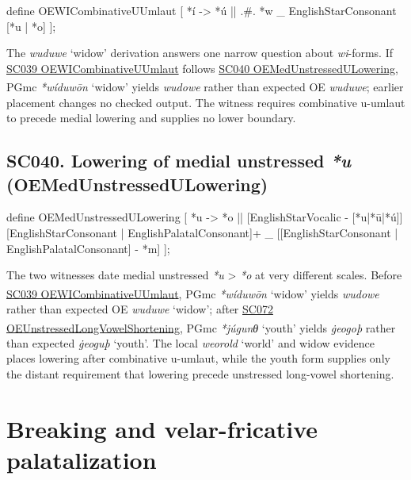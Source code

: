 \documentclass[
  british,
  a4paper,
  openany]{book}
\providecommand{\Pred}[1]{\textsuperscript{\dag}\emph{#1}}
\providecommand{\Recon}[1]{\emph{*#1}}
{\catcode`→=\active \global\def→{\ensuremath{\rightarrow}}}
\providecommand{\texorpdfstring}[2]{#1}
\DeclareRobustCommand{\CAPRRuleHeading}[2]{%
  #1\texorpdfstring{\\(#2)}{ (#2)}%
}
\providecommand{\Pred}[1]{\textsuperscript{\dag}\emph{#1}}
\providecommand{\Recon}[1]{\emph{*#1}}
{\catcode`→=\active \global\def→{\ensuremath{\rightarrow}}}
\begin{document}
\begin{ReaderFacingFoma}
define OEWICombinativeUUmlaut [
    {*í} -> {*ú}
        || .#. {*w} _ EnglishStarConsonant [{*u} | {*o}]
];
\end{ReaderFacingFoma}

The \emph{wuduwe} `widow' derivation answers one narrow question about
\emph{wi}-forms. If \hyperref[rule-OEWICombinativeUUmlaut]{SC039
OEWICombinativeUUmlaut} follows
\hyperref[rule-OEMedUnstressedULowering]{SC040
OEMedUnstressedULowering}, PGmc \Recon{wíduwōn} `widow' yields
\Pred{wudowe} rather than expected OE \emph{wuduwe}; earlier placement
changes no checked output. The witness requires combinative u-umlaut to
precede medial lowering and supplies no lower boundary.

\subsection{\texorpdfstring{\CAPRRuleHeading{SC040. Lowering of medial unstressed \emph{*u}}{OEMedUnstressedULowering}}{}}\label{rule-OEMedUnstressedULowering}

\begin{ReaderFacingFoma}
define OEMedUnstressedULowering [
    {*u} -> {*o}
        || [EnglishStarVocalic - [{*u}|{*ū}|{*ú}]]
           [EnglishStarConsonant | EnglishPalatalConsonant]+ _
           [[EnglishStarConsonant | EnglishPalatalConsonant] - {*m}]
];
\end{ReaderFacingFoma}

The two witnesses date medial unstressed \emph{*u} \textgreater{}
\emph{*o} at very different scales. Before
\hyperref[rule-OEWICombinativeUUmlaut]{SC039 OEWICombinativeUUmlaut},
PGmc \Recon{wíduwōn} `widow' yields \Pred{wudowe} rather than expected
OE \emph{wuduwe} `widow'; after
\hyperref[rule-OEUnstressedLongVowelShortening]{SC072
OEUnstressedLongVowelShortening}, PGmc \Recon{júgunθ} `youth' yields
\Pred{ġeogoþ} rather than expected \emph{ġeoguþ} `youth'. The local
\emph{weorold} `world' and widow evidence places lowering after
combinative u-umlaut, while the youth form supplies only the distant
requirement that lowering precede unstressed long-vowel shortening.

\newpage

\section{Breaking and velar-fricative
palatalization}\label{breaking-and-velar-fricative-palatalization}
\end{document}
